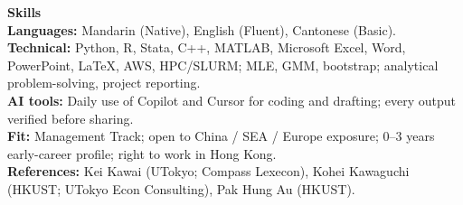\documentclass[11pt,letterpaper]{article}
\begin{document}
\vspace{0.15pt}

{\large \textbf{Skills}}\\[-0.5pt]
\textbf{Languages:} Mandarin (Native), English (Fluent), Cantonese (Basic).\\
\textbf{Technical:} Python, R, Stata, C++, MATLAB, Microsoft Excel, Word, PowerPoint, \LaTeX, AWS, HPC/SLURM; MLE, GMM, bootstrap; analytical problem-solving, project reporting.\\
\textbf{AI tools:} Daily use of Copilot and Cursor for coding and drafting; every output verified before sharing.\\
\textbf{Fit:} Management Track; open to China / SEA / Europe exposure; 0--3 years early-career profile; right to work in Hong Kong.\\
\textbf{References:} Kei Kawai (UTokyo; Compass Lexecon), Kohei Kawaguchi (HKUST; UTokyo Econ Consulting), Pak Hung Au (HKUST).
\end{document}
